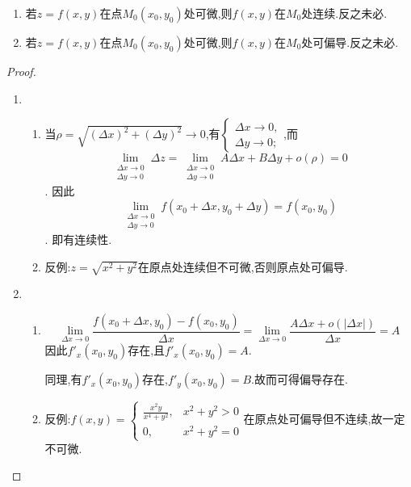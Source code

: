 \begin{theorem}
    \begin{enumerate}
        \item 若$z=f(x,y)$在点$M_0(x_0,y_0)$处可微,则$f(x,y)$在$M_0$处连续.反之未必.
        \item 若$z=f(x,y)$在点$M_0(x_0,y_0)$处可微,则$f(x,y)$在$M_0$处可偏导.反之未必.
    \end{enumerate}
\end{theorem}
\begin{proof}
    \begin{enumerate}
        \item 
            \begin{enumerate}
                \item 当$\rho=\sqrt{(\Delta x)^2+(\Delta y)^2}\to 0$,有$\begin{cases}
                \Delta x\to 0,\\
                \Delta y\to 0;
                \end{cases}$,而$$\lim_{\substack{\Delta x\to 0\\\Delta y \to 0}}\Delta z=\lim_{\substack{\Delta x\to 0\\\Delta y \to 0}}A\Delta x+B\Delta y+o(\rho)=0$$.
                因此$$\lim_{\substack{\Delta x\to 0\\\Delta y \to 0}}f(x_0+\Delta x,y_0+\Delta y)=f(x_0,y_0)$$.
                即有连续性.
                \item 反例:$z=\sqrt{x^2+y^2}$在原点处连续但不可微,否则原点处可偏导.
            \end{enumerate}
        \item 
            \begin{enumerate}
                \item $$\lim_{\Delta x\to 0}\frac{f(x_0+\Delta x,y_0)-f(x_0,y_0)}{\Delta x}=\lim_{\Delta x\to 0}\frac{A\Delta x+o(|\Delta x|)}{\Delta x}=A$$
                因此$f'_x(x_0,y_0)$存在,且$f'_x(x_0,y_0)=A$.
        
                同理,有$f'_x(x_0,y_0)$存在,$f'_y(x_0,y_0)=B$.故而可得偏导存在.
                \item 反例:$f(x,y)=\begin{cases}
                    \frac{x^2y}{x^4+y^2},&x^2+y^2>0\\
                    0,&x^2+y^2=0
                \end{cases}$在原点处可偏导但不连续,故一定不可微.
            \end{enumerate}
    \end{enumerate}
\end{proof}

